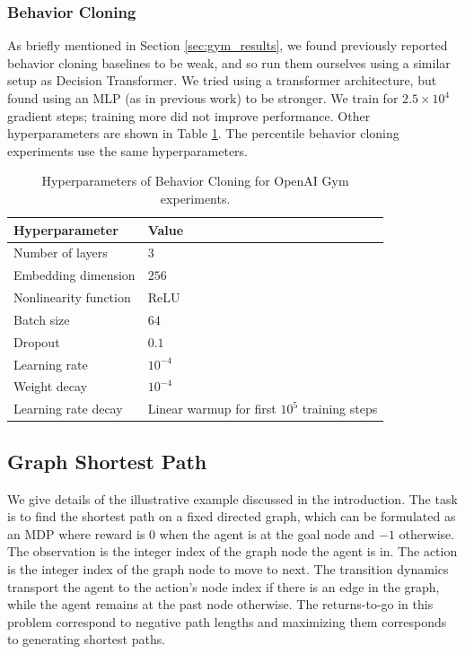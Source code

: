 \subsubsection{Behavior Cloning}

As briefly mentioned in Section \ref{sec:gym_results}, we found previously reported behavior cloning baselines to be weak, and so run them ourselves using a similar setup as Decision Transformer.
We tried using a transformer architecture, but found using an MLP (as in previous work) to be stronger.
We train for $2.5 \times 10^4$ gradient steps; training more did not improve performance.
Other hyperparameters are shown in Table \ref{tbl:gym_bc_hyperparameters}.
The percentile behavior cloning experiments use the same hyperparameters.

\begin{table}[ht]
\caption{Hyperparameters of Behavior Cloning for OpenAI Gym experiments.}
\vskip 0.15in
\begin{center}
\begin{small}
\begin{tabular}{ll}
\toprule
\textbf{Hyperparameter} & \textbf{Value}  \\
\midrule
Number of layers & $3$ \\
Embedding dimension & $256$  \\ 
Nonlinearity function & ReLU \\
Batch size   & $64$ \\
Dropout & $0.1$ \\
Learning rate & $10^{-4}$ \\
Weight decay & $10^{-4}$ \\
Learning rate decay & Linear warmup for first $10^5$ training steps \\
\bottomrule
\end{tabular}
\end{small}
\label{tbl:gym_bc_hyperparameters}
\end{center}
\end{table} 

\subsection{Graph Shortest Path}

We give details of the illustrative example discussed in the introduction. The task is to find the shortest path on a fixed directed graph, which can be formulated as an MDP where reward is $0$ when the agent is at the goal node and $-1$ otherwise. The observation is the integer index of the graph node the agent is in. The action is the integer index of the graph node to move to next. The transition dynamics transport the agent to the action's node index if there is an edge in the graph, while the agent remains at the past node otherwise. The returns-to-go in this problem correspond to negative path lengths and maximizing them corresponds to generating shortest paths. 

